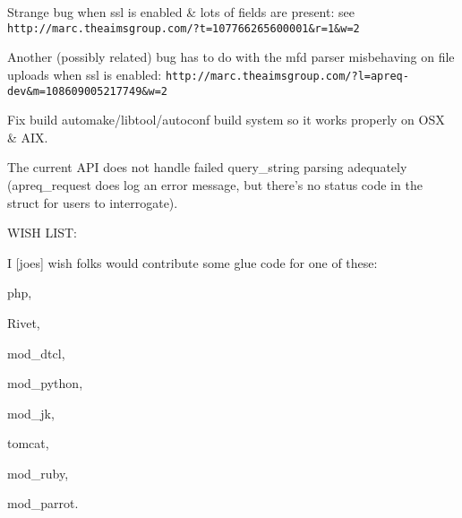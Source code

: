 \begin{CompactItemize}
\item 
Strange bug when ssl is enabled \& lots of fields are present: see {\tt http://marc.theaimsgroup.com/?t=107766265600001\&r=1\&w=2}\end{CompactItemize}
\begin{CompactItemize}
\item 
Another (possibly related) bug has to do with the mfd parser misbehaving on file uploads when ssl is enabled: {\tt http://marc.theaimsgroup.com/?l=apreq-dev\&m=108609005217749\&w=2}\end{CompactItemize}
\begin{CompactItemize}
\item 
Fix build automake/libtool/autoconf build system so it works properly on OSX \& AIX.\end{CompactItemize}
\begin{CompactItemize}
\item 
The current API does not handle failed query\_\-string parsing adequately (apreq\_\-request does log an error message, but  there's no status code in the struct for users to interrogate).\end{CompactItemize}
WISH LIST:

\begin{CompactItemize}
\item 
I [joes] wish folks would contribute some glue code for one of these:\end{CompactItemize}
\begin{CompactItemize}
\item 
php,\item 
Rivet,\item 
mod\_\-dtcl, \item 
mod\_\-python, \item 
mod\_\-jk, \item 
tomcat,\item 
mod\_\-ruby,\item 
mod\_\-parrot.\end{CompactItemize}
